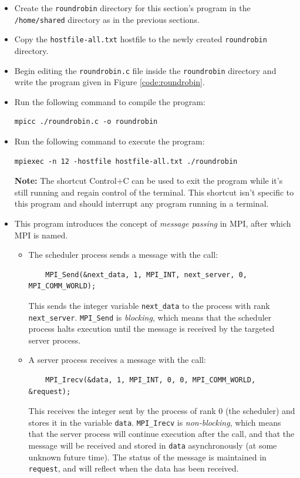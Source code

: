 \documentclass{article}
\begin{document}
\begin{itemize}
\item Create the \texttt{roundrobin} directory for this section's program in the \texttt{/home/shared} directory as in the previous sections.

\item Copy the \texttt{hostfile-all.txt} hostfile to the newly created \texttt{roundrobin} directory.

\item Begin editing the \texttt{roundrobin.c} file inside the \texttt{roundrobin} directory and write the program given in Figure \ref{code:roundrobin}.

\item Run the following command to compile the program:
\begin{verbatim}
mpicc ./roundrobin.c -o roundrobin
\end{verbatim}

\item Run the following command to execute the program:
\begin{verbatim}
mpiexec -n 12 -hostfile hostfile-all.txt ./roundrobin
\end{verbatim}



\textbf{Note:} The shortcut Control+C can be used to exit the program while it's still running and regain control of the terminal. This shortcut isn't specific to this program and should interrupt any program running in a terminal.

\item This program introduces the concept of \emph{message passing} in MPI, after which MPI is named.
\begin{itemize}
        \item The scheduler process sends a message with the call:
\begin{verbatim}
    MPI_Send(&next_data, 1, MPI_INT, next_server, 0, MPI_COMM_WORLD);\end{verbatim}
    This sends the integer variable \texttt{next\_data} to the process with rank \texttt{next\_server}. \texttt{MPI\_Send} is \emph{blocking}, which means that the scheduler process halts execution until the message is received by the targeted server process.
    
    \item A server process receives a message with the call:
\begin{verbatim}
    MPI_Irecv(&data, 1, MPI_INT, 0, 0, MPI_COMM_WORLD, &request);\end{verbatim}
    This receives the integer sent by the process of rank $0$ (the scheduler) and stores it in the variable \texttt{data}. \texttt{MPI\_Irecv} is \emph{non-blocking}, which means that the server process will continue execution after the call, and that the message will be received and stored in \texttt{data} asynchronously (at some unknown future time). The status of the message is maintained in \texttt{request}, and will reflect when the data has been received.
    

\end{itemize}
\end{itemize}
\end{document}
